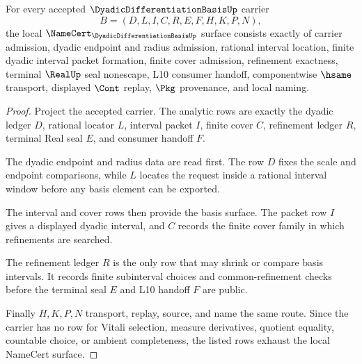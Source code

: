 \begin{theorem}
\label{thm:dyadic-differentiation-basis-obligations}
For every accepted $\DyadicDifferentiationBasisUp$ carrier
$$
B=(D,L,I,C,R,E,F,H,K,P,N),
$$
the local $\NameCert_{\DyadicDifferentiationBasisUp}$ surface consists exactly of carrier admission, dyadic endpoint and radius admission, rational interval location, finite dyadic interval packet formation, finite cover admission, refinement exactness, terminal $\RealUp$ seal nonescape, L10 consumer handoff, componentwise $\hsame$ transport, displayed $\Cont$ replay, $\Pkg$ provenance, and local naming.
\end{theorem}
\begin{proof}
Project the accepted carrier. The analytic rows are exactly the dyadic ledger $D$, rational locator $L$, interval packet $I$, finite cover $C$, refinement ledger $R$, terminal Real seal $E$, and consumer handoff $F$.

The dyadic endpoint and radius data are read first. The row $D$ fixes the scale and endpoint comparisons, while $L$ locates the request inside a rational interval window before any basis element can be exported.

The interval and cover rows then provide the basis surface. The packet row $I$ gives a displayed dyadic interval, and $C$ records the finite cover family in which refinements are searched.

The refinement ledger $R$ is the only row that may shrink or compare basis intervals. It records finite subinterval choices and common-refinement checks before the terminal seal $E$ and L10 handoff $F$ are public.

Finally $H,K,P,N$ transport, replay, source, and name the same route. Since the carrier has no row for Vitali selection, measure derivatives, quotient equality, countable choice, or ambient completeness, the listed rows exhaust the local NameCert surface.
\end{proof}

